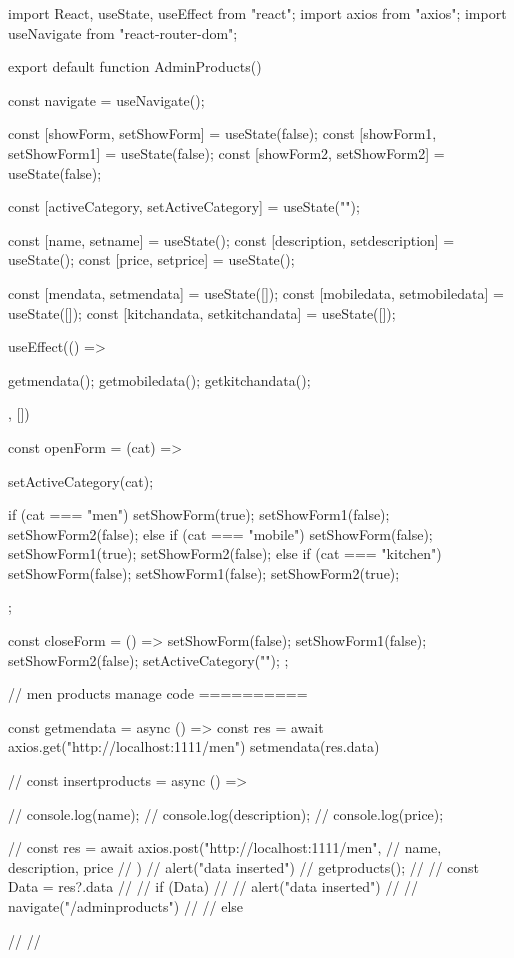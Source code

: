 import React, { useState, useEffect } from "react";
import axios from "axios";
import { useNavigate } from "react-router-dom";

export default function AdminProducts() {
  const navigate = useNavigate();

  const [showForm, setShowForm] = useState(false);
  const [showForm1, setShowForm1] = useState(false);
  const [showForm2, setShowForm2] = useState(false);

  const [activeCategory, setActiveCategory] = useState("");

  const [name, setname] = useState();
  const [description, setdescription] = useState();
  const [price, setprice] = useState();

  const [mendata, setmendata] = useState([]);
  const [mobiledata, setmobiledata] = useState([]);
  const [kitchandata, setkitchandata] = useState([]);

  useEffect(() => {
    getmendata();
    getmobiledata();
    getkitchandata();

  }, [])


  const openForm = (cat) => {
    setActiveCategory(cat);

    if (cat === "men") {
      setShowForm(true);
      setShowForm1(false);
      setShowForm2(false);
    } else if (cat === "mobile") {
      setShowForm(false);
      setShowForm1(true);
      setShowForm2(false);
    } else if (cat === "kitchen") {
      setShowForm(false);
      setShowForm1(false);
      setShowForm2(true);
    }
  };


  const closeForm = () => {
    setShowForm(false);
    setShowForm1(false);
    setShowForm2(false);
    setActiveCategory("");
  };


  // men products manage code ==========


  const getmendata = async () => {
    const res = await axios.get("http://localhost:1111/men")
    setmendata(res.data)
  }

  // const insertproducts = async () => {
  //   console.log(name);
  //   console.log(description);
  //   console.log(price);

  //   const res = await axios.post("http://localhost:1111/men", {
  //     name, description, price
  //   })
  //   alert("data inserted")
  // getproducts();
  //   // const Data = res?.data
  //   // if (Data) {
  //   //   alert("data inserted")
  //   //   navigate("/adminproducts")
  //   // } else {

  //   // }

}}

